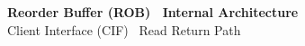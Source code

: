 \documentclass[10pt]{article}
\begin{document}
\thispagestyle{fancy}

\begin{center}
  {\large\bfseries\color{NavyD}
    Reorder Buffer (ROB) \textemdash\ Internal Architecture}\\[3pt]
  {\small\color{MGRAY} Client Interface (CIF) \textemdash\ Read Return Path}
\end{center}
\vspace{2pt}

\end{document}

